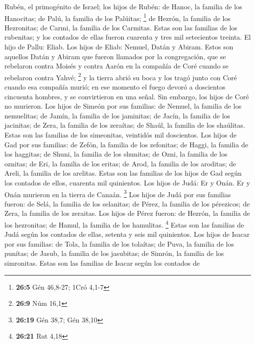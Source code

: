 \begin{paracol}{2}
 Rubén, el primogénito de Israel; los hijos de Rubén: de
Hanoc, la familia de los Hanocitas; de Palú, la familia de los Palúitas;
\footnote{\textbf{26:5} Gén 46,8-27; 1Cró 4,1-7}  de
Hezrón, la familia de los Hezronitas; de Carmi, la familia de los
Carmitas.  Estas son las familias de los rubenitas; y los
contados de ellas fueron cuarenta y tres mil setecientos treinta.
 El hijo de Pallu: Eliab.  Los hijos de
Eliab: Nemuel, Datán y Abiram. Estos son aquellos Datán y Abiram que
fueron llamados por la congregación, que se rebelaron contra Moisés y
contra Aarón en la compañía de Coré cuando se rebelaron contra Yahvé;
\footnote{\textbf{26:9} Núm 16,1}  y la tierra abrió su
boca y los tragó junto con Coré cuando esa compañía murió; en ese
momento el fuego devoró a doscientos cincuenta hombres, y se
convirtieron en una señal.  Sin embargo, los hijos de
Coré no murieron.  Los hijos de Simeón por sus familias:
de Nemuel, la familia de los nemuelitas; de Jamín, la familia de los
jaminitas; de Jacín, la familia de los jacinitas;  de
Zera, la familia de los zeraítas; de Shaúl, la familia de los shaúlitas.
 Estas son las familias de los simeonitas, veintidós mil
doscientos.  Los hijos de Gad por sus familias: de Zefón,
la familia de los zefonitas; de Haggi, la familia de los haggitas; de
Shuni, la familia de los shunitas;  de Ozni, la familia
de los oznitas; de Eri, la familia de los eritas;  de
Arod, la familia de los aroditas; de Areli, la familia de los arelitas.
 Estas son las familias de los hijos de Gad según los
contados de ellos, cuarenta mil quinientos.  Los hijos de
Judá: Er y Onán. Er y Onán murieron en la tierra de Canaán. \footnote{\textbf{26:19}
  Gén 38,7; Gén 38,10}  Los hijos de Judá por sus
familias fueron: de Selá, la familia de los selanitas; de Pérez, la
familia de los pérezicos; de Zera, la familia de los zeraitas.
 Los hijos de Pérez fueron: de Hezrón, la familia de los
hezronitas; de Hamul, la familia de los hamulitas. \footnote{\textbf{26:21}
  Rut 4,18}  Estas son las familias de Judá según los
contados de ellas, setenta y seis mil quinientos.  Los
hijos de Isacar por sus familias: de Tola, la familia de los tolaítas;
de Puva, la familia de los punítas;  de Jasub, la familia
de los jasubitas; de Simrón, la familia de los simronitas.
 Estas son las familias de Isacar según los contados de

\end{paracol}
